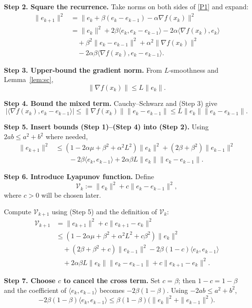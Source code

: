\documentclass[11pt]{article}
\begin{document}
\noindent\textbf{Step 2. Square the recurrence.}  
Take norms on both sides of \eqref{P1} and expand:
\[
\begin{aligned}
\|e_{k+1}\|^{2}
&=\|e_k+\beta(e_k-e_{k-1})-\alpha\nabla f(x_k)\|^{2}\\
&=\|e_k\|^{2}+2\beta\langle e_k,e_k-e_{k-1}\rangle-2\alpha\langle\nabla f(x_k),e_k\rangle\\
&\quad+\beta^{2}\|e_k-e_{k-1}\|^{2}+\alpha^{2}\|\nabla f(x_k)\|^{2}\\
&\quad-2\alpha\beta\langle\nabla f(x_k),e_k-e_{k-1}\rangle .
\end{aligned}
\tag{Step 2}
\]

\noindent\textbf{Step 3. Upper‑bound the gradient norm.}  
From $L$‑smoothness and Lemma~\ref{lem:sc},
\[
\|\nabla f(x_k)\|\le L\|e_k\|.
\tag{Step 3}
\]

\noindent\textbf{Step 4. Bound the mixed term.}  
Cauchy–Schwarz and (Step 3) give
\[
|\langle\nabla f(x_k),e_k-e_{k-1}\rangle|
\le \|\nabla f(x_k)\|\|e_k-e_{k-1}\|
\le L\|e_k\|\|e_k-e_{k-1}\|.
\tag{Step 4}
\]

\noindent\textbf{Step 5. Insert bounds (Step 1)–(Step 4) into (Step 2).}  
Using $2ab\le a^{2}+b^{2}$ where needed,
\[
\begin{aligned}
\|e_{k+1}\|^{2}
&\le (1-2\alpha\mu+\beta^{2}+ \alpha^{2}L^{2})\|e_k\|^{2}
      + (2\beta+\beta^{2})\|e_{k-1}\|^{2}\\
&\qquad -2\beta\langle e_k,e_{k-1}\rangle
      +2\alpha\beta L\|e_k\|\|e_k-e_{k-1}\|.
\end{aligned}
\tag{Step 5}
\]

\noindent\textbf{Step 6. Introduce Lyapunov function.}  
Define
\[
\mathcal{V}_k:=\|e_k\|^{2}+c\|e_k-e_{k-1}\|^{2},
\tag{Step 6}
\]
where $c>0$ will be chosen later.  

Compute $\mathcal{V}_{k+1}$ using (Step 5) and the definition of $\mathcal{V}_k$:
\[
\begin{aligned}
\mathcal{V}_{k+1}
&=\|e_{k+1}\|^{2}+c\|e_{k+1}-e_k\|^{2}\\
&\le (1-2\alpha\mu+\beta^{2}+\alpha^{2}L^{2}+c\beta^{2})\|e_k\|^{2}\\
&\quad+ (2\beta+\beta^{2}+c)\|e_{k-1}\|^{2}
      -2\beta(1-c)\langle e_k,e_{k-1}\rangle\\
&\quad+2\alpha\beta L\|e_k\|\|e_k-e_{k-1}\|
      +c\|e_{k+1}-e_k\|^{2}.
\end{aligned}
\tag{Step 6}
\]

\noindent\textbf{Step 7. Choose $c$ to cancel the cross term.}  
Set $c= \beta$; then $1-c=1-\beta$ and the coefficient of $\langle e_k,e_{k-1}\rangle$ becomes $-2\beta(1-\beta)$. Using $-2ab\le a^{2}+b^{2}$,
\[
-2\beta(1-\beta)\langle e_k,e_{k-1}\rangle
\le \beta(1-\beta)\bigl(\|e_k\|^{2}+\|e_{k-1}\|^{2}\bigr).
\tag{Step 7}
\]
\end{document}
